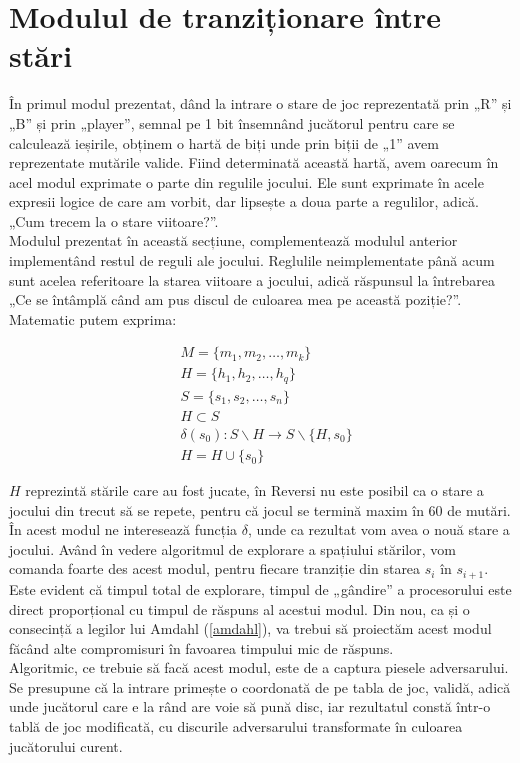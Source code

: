 \documentclass[12pt,twoside,a4paper,fleqn]{book}
\theoremstyle{definition}
\begin{document}
\section{Modulul de tranziționare între stări}
În primul modul prezentat, dând la intrare o stare de joc reprezentată prin „R” și „B” și prin „player”, semnal pe 1 bit însemnând jucătorul pentru care se calculează ieșirile, obținem o hartă de biți unde prin biții de „1” avem reprezentate mutările valide. Fiind determinată această hartă, avem oarecum în acel modul exprimate o parte din regulile jocului. Ele sunt exprimate în acele expresii logice de care am vorbit, dar lipsește a doua parte a regulilor, adică. „Cum trecem la o stare viitoare?”.\\
Modulul prezentat în această secțiune, complementează modulul anterior implementând restul de reguli ale jocului. Reglulile neimplementate până acum sunt acelea referitoare la starea viitoare a jocului, adică răspunsul la întrebarea „Ce se întâmplă când am pus discul de culoarea mea pe această poziție?”.
Matematic putem exprima:
% 
%



\begin{align}
\label{game_formal}
&M=\lbrace m_{1}, m_{2}, \ldots , m_{k} \rbrace\\
&H=\lbrace h_{1}, h_{2}, \ldots , h_{q} \rbrace\\
&S=\lbrace s_{1}, s_{2}, \ldots , s_{n} \rbrace\\
&H\subset S\\
&\delta(s_{0}) : S\backslash H \rightarrow S\backslash \{H, s_{0}\}\\
&H = H \cup \lbrace s_{0} \rbrace
\end{align}


%
%

$H$ reprezintă stările care au fost jucate, în Reversi nu este posibil ca o stare a jocului din trecut să se repete, pentru că jocul se termină maxim în $60$ de mutări.\\
În acest modul ne interesează funcția $\delta$, unde ca rezultat vom avea o nouă stare a jocului. Având în vedere algoritmul de explorare a spațiului stărilor, vom comanda foarte des acest modul, pentru fiecare tranziție din starea $s_{i}$ în $s_{i+1}$. Este evident că timpul total de explorare, timpul de „gândire” a procesorului este direct proporțional cu timpul de răspuns al acestui modul. Din nou, ca și o consecință a legilor lui Amdahl (\ref{amdahl}), va trebui să proiectăm acest modul făcând alte compromisuri în favoarea timpului mic de răspuns.\\
Algoritmic, ce trebuie să facă acest modul, este de a captura piesele adversarului. Se presupune că la intrare primește o coordonată de pe tabla de joc, validă, adică unde jucătorul care e la rând are voie să pună disc, iar rezultatul constă într-o tablă de joc modificată, cu discurile adversarului transformate în culoarea jucătorului curent.
\end{document}
